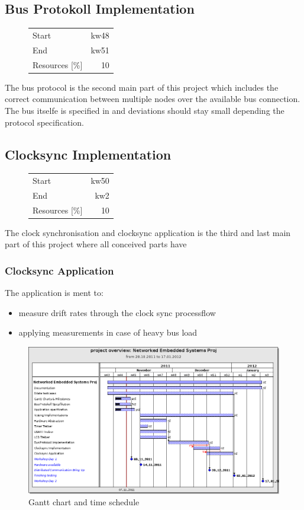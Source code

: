 \subsection{Bus Protokoll Implementation}
\begin{figure}
\begin{tabular}[t]{|lr|}
\hline
Start & kw48\\
End & kw51\\
Resources [\%] & 10\\
\hline
\end{tabular}
\end{figure}
The bus protocol is the second main part of this project which includes the correct communication
between multiple nodes over the available bus connection. 
The bus itselfe is specified in \cite [NESD2]{NESD2} and deviations should stay small depending 
the protocol specification.
\subsection{Clocksync Implementation}
\begin{figure}
\begin{tabular}[t]{|lr|}
\hline
Start & kw50\\
End & kw2\\
Resources [\%] & 10\\
\hline
\end{tabular}
\end{figure}
The clock synchronisation and clocksync application is the third and last main part of 
this project where all conceived parts have
\subsubsection{Clocksync Application}
The application is ment to:
\begin{itemize}
 \item measure drift rates through the clock sync processflow
 \item applying measurements in case of heavy bus load
\end{itemize}

\begin{figure}[ht]
 \centering
 \includegraphics[angle=90,scale=0.6,keepaspectratio=true]{../images/201111_ganttchart.png}
 \caption{Gantt chart and time schedule}
 \label{fig:gantt chart}
\end{figure}
